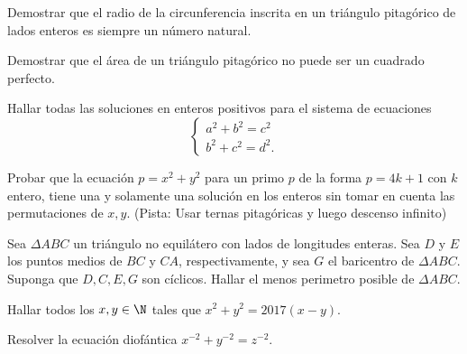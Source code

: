 \begin{problem}
    Demostrar que el radio de la circunferencia inscrita en un triángulo pitagórico de lados enteros es siempre un número natural.
\end{problem}

\begin{problem}
    Demostrar que el área de un triángulo pitagórico no puede ser un cuadrado perfecto.
\end{problem}

\begin{problem}
    Hallar todas las soluciones en enteros positivos para el sistema de ecuaciones
    \[
        \begin{cases}
            a^2 + b^2 = c^2\\
            b^2 + c^2 = d^2.
        \end{cases}
    \]
\end{problem}

\begin{problem}
    Probar que la ecuación $p = x^2 + y^2$ para un primo $p$ de la forma $p = 4k + 1$ con $k$ entero, tiene una y
    solamente una solución en los enteros sin tomar en cuenta las permutaciones de $x,y$.
    (Pista: Usar ternas pitagóricas y luego descenso infinito)
\end{problem}

\begin{problem}
    Sea $\Delta ABC$ un triángulo no equilátero con lados de longitudes enteras.
    Sea $D$ y $E$ los puntos medios de $BC$ y $CA$, respectivamente, y sea $G$ el baricentro de $\Delta ABC$.
    Suponga que $D,C,E, G$ son cíclicos.
    Hallar el menos perimetro posible de $\Delta ABC$.
\end{problem}

\begin{problem}
    Hallar todos los $x,y \in \N$ tales que $x^2 + y^2 = 2017(x - y)$.
\end{problem}

\begin{problem}
    Resolver la ecuación diofántica $x^{-2} + y^{-2} = z^{-2}.$
\end{problem}